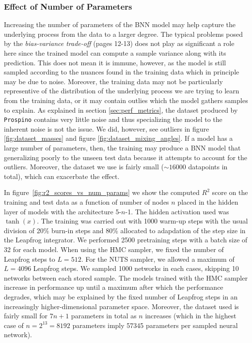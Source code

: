 \subsubsection{Effect of Number of Parameters}
Increasing the number of parameters of the BNN model may help capture the underlying process from the data to a larger degree. The typical problems posed by the \textit{bias-variance trade-off} \cite{ml_for_physicists} (pages 12-13) does not play as significant a role here since the trained model can compute a sample variance along with its prediction. This does not mean it is immune, however, as the model is still sampled according to the nuances found in the training data which in principle may be due to noise. Moreover, the training data may not be particularly representive of the distribution of the underlying process we are trying to learn from the training data, or it may contain outlies which the model gathers samples to explain. As explained in section \ref{sec:perf_metrics}, the dataset produced by {\tt Prospino} contains very little noise and thus specializing the model to the inherent noise is not the issue. We did, however, see outliers in figure \ref{fig:dataset_masses} and figure \ref{fig:dataset_mixing_angles}. If a model has a large number of parameters, then, the training may produce a BNN model that generalizing poorly to the unseen test data because it attempts to account for the outliers. Moreover, the dataset we use is fairly small ($\sim 16000$ datapoints in total), which can exacerbate the effect.

In figure~\ref{fig:r2_scores_vs_num_params} we show the computed $R^2$ score on the training and test data as a function of number of nodes $n$ placed in the hidden layer of models with the architecture 5-$n$-1. The hidden activation used was $\tanh(x)$. The training was carried out with 1000 warm-up steps with the usual division of 20\% burn-in steps and 80\% allocated to adapdation of the step size in the Leapfrog integrator. We performed 2500 pretraining steps with a batch size of 32 for each model. When using the HMC sampler, we fixed the number of Leapfrog steps to $L = 512$. For the NUTS sampler, we allowed a maximum of $L = 4096$ Leapfrog steps. We sampled 1000 networks in each cases, skipping 10 networks between each stored sample. The models trained with the HMC sampler increase in performance up until a maximum after which the performance degrades, which may be explained by the fixed number of Leapfrog steps in an increasingly higher-dimensional parameter space. Moreover, the dataset used is fairly small for $7n + 1$ parameters in total as $n$ increases (which in the highest case of $n = 2^13 = 8192$ parameters imply 57345 parameters per sampled neural network). 

